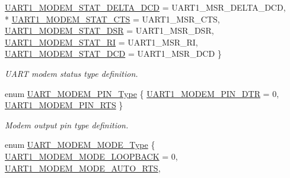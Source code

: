 \begin{DoxyCompactItemize}
\hyperlink{group___u_a_r_t___public___types_gga2f7d223e1fdf6018ff08109bb1c976efa96fa592faed2ab9230d8c7b598d7ee8c}{U\+A\+R\+T1\+\_\+\+M\+O\+D\+E\+M\+\_\+\+S\+T\+A\+T\+\_\+\+D\+E\+L\+T\+A\+\_\+\+D\+CD} = U\+A\+R\+T1\+\_\+\+M\+S\+R\+\_\+\+D\+E\+L\+T\+A\+\_\+\+D\+CD, 
\\*
\hyperlink{group___u_a_r_t___public___types_gga2f7d223e1fdf6018ff08109bb1c976efa42a44429762b58e08934c4290026045b}{U\+A\+R\+T1\+\_\+\+M\+O\+D\+E\+M\+\_\+\+S\+T\+A\+T\+\_\+\+C\+TS} = U\+A\+R\+T1\+\_\+\+M\+S\+R\+\_\+\+C\+TS, 
\hyperlink{group___u_a_r_t___public___types_gga2f7d223e1fdf6018ff08109bb1c976efaab5eaf0f8cc37785653464638f60fe15}{U\+A\+R\+T1\+\_\+\+M\+O\+D\+E\+M\+\_\+\+S\+T\+A\+T\+\_\+\+D\+SR} = U\+A\+R\+T1\+\_\+\+M\+S\+R\+\_\+\+D\+SR, 
\hyperlink{group___u_a_r_t___public___types_gga2f7d223e1fdf6018ff08109bb1c976efa04c1c7ce8182b3afcd61583bda850bff}{U\+A\+R\+T1\+\_\+\+M\+O\+D\+E\+M\+\_\+\+S\+T\+A\+T\+\_\+\+RI} = U\+A\+R\+T1\+\_\+\+M\+S\+R\+\_\+\+RI, 
\hyperlink{group___u_a_r_t___public___types_gga2f7d223e1fdf6018ff08109bb1c976efaa402d76f2f9133abea5f4be5e682479f}{U\+A\+R\+T1\+\_\+\+M\+O\+D\+E\+M\+\_\+\+S\+T\+A\+T\+\_\+\+D\+CD} = U\+A\+R\+T1\+\_\+\+M\+S\+R\+\_\+\+D\+CD
 \}\begin{DoxyCompactList}\small\item\em U\+A\+RT modem status type definition. \end{DoxyCompactList}
\item 
enum \hyperlink{group___u_a_r_t___public___types_gabfc7ec239b7d598e6a2cc163e66b76fc}{U\+A\+R\+T\+\_\+\+M\+O\+D\+E\+M\+\_\+\+P\+I\+N\+\_\+\+Type} \{ \hyperlink{group___u_a_r_t___public___types_ggabfc7ec239b7d598e6a2cc163e66b76fcac831b7aff6c92cfb78dab2a0bf6bd97c}{U\+A\+R\+T1\+\_\+\+M\+O\+D\+E\+M\+\_\+\+P\+I\+N\+\_\+\+D\+TR} = 0, 
\hyperlink{group___u_a_r_t___public___types_ggabfc7ec239b7d598e6a2cc163e66b76fcafb10c5304a783fa1d234d72a9d1ff056}{U\+A\+R\+T1\+\_\+\+M\+O\+D\+E\+M\+\_\+\+P\+I\+N\+\_\+\+R\+TS}
 \}\begin{DoxyCompactList}\small\item\em Modem output pin type definition. \end{DoxyCompactList}
\item 
enum \hyperlink{group___u_a_r_t___public___types_ga55fc73bec4c58ad15d24b05095c4523a}{U\+A\+R\+T\+\_\+\+M\+O\+D\+E\+M\+\_\+\+M\+O\+D\+E\+\_\+\+Type} \{ \hyperlink{group___u_a_r_t___public___types_gga55fc73bec4c58ad15d24b05095c4523aa0c1c7817a58775f439acb102614f350b}{U\+A\+R\+T1\+\_\+\+M\+O\+D\+E\+M\+\_\+\+M\+O\+D\+E\+\_\+\+L\+O\+O\+P\+B\+A\+CK} = 0, 
\hyperlink{group___u_a_r_t___public___types_gga55fc73bec4c58ad15d24b05095c4523aa7e6608f4e3b1a68f463d3dfbfbf2f09d}{U\+A\+R\+T1\+\_\+\+M\+O\+D\+E\+M\+\_\+\+M\+O\+D\+E\+\_\+\+A\+U\+T\+O\+\_\+\+R\+TS}, 

\end{DoxyCompactItemize}
